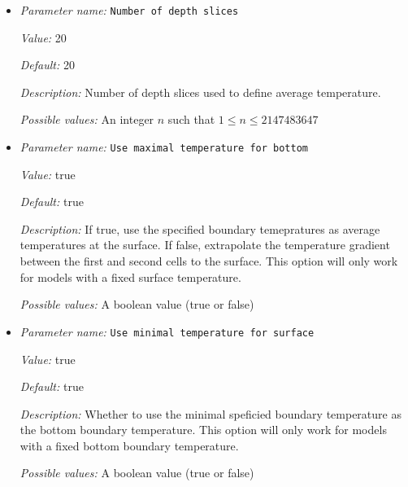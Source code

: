 \begin{itemize}
\item {\it Parameter name:} {\tt Number of depth slices}
\label{parameters:Postprocess/Visualization/Temperature anomaly/Number of depth slices}
\label{parameters:Postprocess/Visualization/Temperature_20anomaly/Number_20of_20depth_20slices}


{\it Value:} 20


{\it Default:} 20


{\it Description:} Number of depth slices used to define average temperature.


{\it Possible values:} An integer $n$ such that $1\leq n \leq 2147483647$
\item {\it Parameter name:} {\tt Use maximal temperature for bottom}
\label{parameters:Postprocess/Visualization/Temperature anomaly/Use maximal temperature for bottom}
\label{parameters:Postprocess/Visualization/Temperature_20anomaly/Use_20maximal_20temperature_20for_20bottom}


{\it Value:} true


{\it Default:} true


{\it Description:} If true, use the specified boundary temepratures as average temperatures at the surface. If false, extrapolate the temperature gradient between the first and second cells to the surface. This option will only work for models with a fixed surface temperature. 


{\it Possible values:} A boolean value (true or false)
\item {\it Parameter name:} {\tt Use minimal temperature for surface}
\label{parameters:Postprocess/Visualization/Temperature anomaly/Use minimal temperature for surface}
\label{parameters:Postprocess/Visualization/Temperature_20anomaly/Use_20minimal_20temperature_20for_20surface}


{\it Value:} true


{\it Default:} true


{\it Description:} Whether to use the minimal speficied boundary temperature as the bottom boundary temperature. This option will only work for models with a fixed bottom boundary temperature. 


{\it Possible values:} A boolean value (true or false)
\end{itemize}

